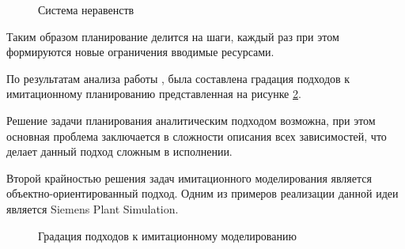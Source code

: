 \begin{figure}[H]
    \caption{Система неравенств}
    \label{ris:sys1}
\end{figure}

Таким образом планирование делится на шаги, каждый раз при этом формируются новые ограничения вводимые ресурсами.

По результатам анализа работы \cite{Jahangirian}, была составлена градация подходов к имитационному планированию представленная на рисунке \ref{ris:IM_detalApp}. 

Решение задачи планирования аналитическим подходом возможна, при этом основная проблема заключается в сложности описания всех зависимостей, что делает данный подход сложным в исполнении.

Второй крайностью решения задач имитационного моделирования является объектно-ориентированный подход. Одним из примеров реализации данной идеи является Siemens Plant Simulation.


\begin{figure}[H]
    \caption{Градация подходов к имитационному моделированию}
    \label{ris:IM_detalApp}
\end{figure}


